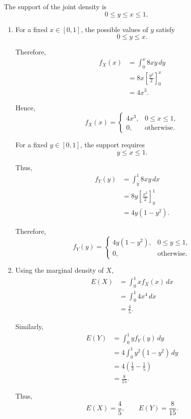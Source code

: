 \documentclass[11pt]{article}
\newenvironment{solution}{
    \par
    \begin{tcolorbox}[
        colback=white,
        colframe=uwgold,
        boxrule=0.7pt,
        arc=2mm,
        left=3mm,
        right=3mm,
        top=2mm,
        bottom=2mm,
        breakable,
        before skip=0.5em,
        after skip=1em,
        title=\textbf{Solution},
        coltitle=uwpurple,
        fonttitle=\bfseries
    ]
}{
    \end{tcolorbox}
}
\begin{document}
\begin{solution}

The support of the joint density is
\[
0\leq y\leq x\leq1.
\]

\begin{enumerate}[label=(\alph*)]

\item For a fixed \(x\in[0,1]\), the possible values of \(y\) satisfy
\[
0\leq y\leq x.
\]

Therefore,
\[
\begin{aligned}
f_X(x)
&=
\int_0^x 8xy\,dy\\
&=
8x\left[\frac{y^2}{2}\right]_0^x\\
&=
4x^3.
\end{aligned}
\]

Hence,
\[
f_X(x)
=
\begin{cases}
4x^3, & 0\leq x\leq1,\\
0, & \text{otherwise}.
\end{cases}
\]

For a fixed \(y\in[0,1]\), the support requires
\[
y\leq x\leq1.
\]

Thus,
\[
\begin{aligned}
f_Y(y)
&=
\int_y^1 8xy\,dx\\
&=
8y\left[\frac{x^2}{2}\right]_y^1\\
&=
4y(1-y^2).
\end{aligned}
\]

Therefore,
\[
f_Y(y)
=
\begin{cases}
4y(1-y^2), & 0\leq y\leq1,\\
0, & \text{otherwise}.
\end{cases}
\]

\item Using the marginal density of \(X\),
\[
\begin{aligned}
E(X)
&=
\int_0^1 x f_X(x)\,dx\\
&=
\int_0^1 4x^4\,dx\\
&=
\frac45.
\end{aligned}
\]

Similarly,
\[
\begin{aligned}
E(Y)
&=
\int_0^1 y f_Y(y)\,dy\\
&=
4\int_0^1 y^2(1-y^2)\,dy\\
&=
4\left(\frac13-\frac15\right)\\
&=
\frac8{15}.
\end{aligned}
\]

Thus,
\[
E(X)=\frac45,
\qquad
E(Y)=\frac8{15}.
\]

\end{enumerate}

\end{solution}
\end{document}
